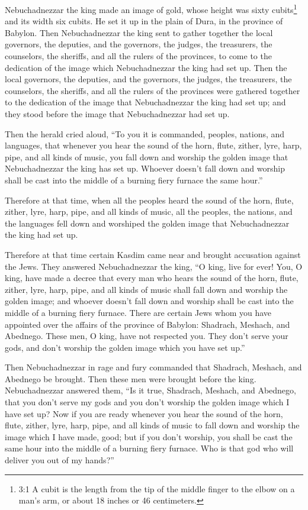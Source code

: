 \mychapter{} \myverse*{}Nebuchadnezzar the king made an image of gold, whose height was
sixty cubits\footnote{3:1 A cubit is the length from the tip of the middle finger to the elbow on a man’s arm, or about
	18 inches or 46 centimeters.} and its width six cubits. He set it up in the plain of Dura, in
the province of Babylon.
\myverse{}Then Nebuchadnezzar the king sent to gather together the local governors, the
deputies, and the governors, the judges, the treasurers, the counselors, the sheriffs, and all the rulers
of the provinces, to come to the dedication of the image which Nebuchadnezzar the king had set up.
\myverse{}Then the local governors, the deputies, and the governors, the judges, the treasurers,
the counselors, the sheriffs, and all the rulers of the provinces were gathered together to the dedication
of the image that Nebuchadnezzar the king had set up; and they stood before the image that Nebuchadnezzar
had set up.

\myverse{}Then the herald cried aloud, “To you it is commanded, peoples,
nations, and languages,
\myverse{}that whenever you hear the sound of the horn, flute, zither, lyre, harp, pipe,
and all kinds of music, you fall down and worship the golden image that Nebuchadnezzar the king has set
up.
\myverse{}Whoever doesn’t fall down and worship shall be cast into the middle of a burning
fiery furnace the same hour.”

\myverse{}Therefore at that time, when all the peoples heard the sound of
the horn, flute, zither, lyre, harp, pipe, and all kinds of music, all the peoples, the nations, and the
languages fell down and worshiped the golden image that Nebuchadnezzar the king had set up.

\myverse{}Therefore at that time certain Kasdim came near and brought accusation
against the Jews.
\myverse{}They answered Nebuchadnezzar the king, “O king, live for ever!
\myverse{}You, O king, have made a decree that every man who hears the sound of the
horn, flute, zither, lyre, harp, pipe, and all kinds of music shall fall down and worship the golden image;
\myverse{}and whoever doesn’t fall down and worship shall be cast into the middle of
a burning fiery furnace.
\myverse{}There are certain Jews whom you have appointed over the affairs of the province
of Babylon: Shadrach, Meshach, and Abednego. These men, O king, have not respected you. They don’t serve
your gods, and don’t worship the golden image which you have set up.”

\myverse{}Then Nebuchadnezzar in rage and fury commanded that Shadrach,
Meshach, and Abednego be brought. Then these men were brought before the king.
\myverse{}Nebuchadnezzar answered them, “Is it true, Shadrach, Meshach, and Abednego,
that you don’t serve my gods and you don’t worship the golden image which I have set up?
\myverse{}Now if you are ready whenever you hear the sound of the horn, flute, zither,
lyre, harp, pipe, and all kinds of music to fall down and worship the image which I have made, good; but
if you don’t worship, you shall be cast the same hour into the middle of a burning fiery furnace. Who
is that god who will deliver you out of my hands?”

